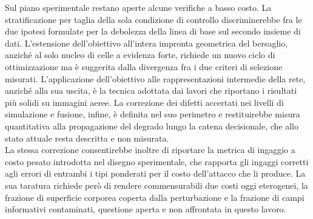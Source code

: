 \documentclass[a4paper,12pt]{report}
\begin{document}
Sul piano sperimentale restano aperte alcune verifiche a basso costo. La stratificazione per taglia della sola condizione di controllo discriminerebbe fra le due ipotesi formulate per la debolezza della linea di base sul secondo insieme di dati. L'estensione dell'obiettivo all'intera impronta geometrica del bersaglio, anziché al solo nucleo di celle a evidenza forte, richiede un nuovo ciclo di ottimizzazione ma è suggerita dalla divergenza fra i due criteri di selezione misurati. L'applicazione dell'obiettivo alle rappresentazioni intermedie della rete, anziché alla sua uscita, è la tecnica adottata dai lavori che riportano i risultati più solidi su immagini aeree. La correzione dei difetti accertati nei livelli di simulazione e fusione, infine, è definita nel suo perimetro e restituirebbe misura quantitativa alla propagazione del degrado lungo la catena decisionale, che allo stato attuale resta descritta e non misurata. \\
La stessa correzione consentirebbe inoltre di
riportare la metrica di ingaggio a costo pesato introdotta nel disegno
sperimentale, che rapporta gli ingaggi corretti agli errori di entrambi i tipi
ponderati per il costo dell'attacco che li produce. La sua taratura richiede
però di rendere commensurabili due costi oggi eterogenei, la frazione di
superficie corporea coperta dalla perturbazione e la frazione di campi
informativi contaminati, questione aperta e non affrontata in questo lavoro.


\printbibliography[heading=bibintoc,title={Bibliografia}]
\end{document}
